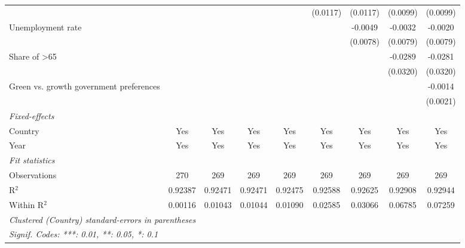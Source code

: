 \begin{table}[htbp]
\begin{tabular}{lcccccccc}
                                                                     &          &          &          &                       & (0.0117) & (0.0117) & (0.0099)              & (0.0099)\\   
      Unemployment rate                                              &          &          &          &                       &          & -0.0049  & -0.0032               & -0.0020\\   
                                                                     &          &          &          &                       &          & (0.0078) & (0.0079)              & (0.0079)\\   
      Share of >65                                                   &          &          &          &                       &          &          & -0.0289               & -0.0281\\   
                                                                     &          &          &          &                       &          &          & (0.0320)              & (0.0320)\\   
      Green vs. growth government preferences                        &          &          &          &                       &          &          &                       & -0.0014\\   
                                                                     &          &          &          &                       &          &          &                       & (0.0021)\\   
      \midrule
      \emph{Fixed-effects}\\
      Country                                                        & Yes      & Yes      & Yes      & Yes                   & Yes      & Yes      & Yes                   & Yes\\  
      Year                                                           & Yes      & Yes      & Yes      & Yes                   & Yes      & Yes      & Yes                   & Yes\\  
      \midrule
      \emph{Fit statistics}\\
      Observations                                                   & 270      & 269      & 269      & 269                   & 269      & 269      & 269                   & 269\\  
      R$^2$                                                          & 0.92387  & 0.92471  & 0.92471  & 0.92475               & 0.92588  & 0.92625  & 0.92908               & 0.92944\\  
      Within R$^2$                                                   & 0.00116  & 0.01043  & 0.01044  & 0.01090               & 0.02585  & 0.03066  & 0.06785               & 0.07259\\  
      \midrule \midrule
      \multicolumn{9}{l}{\emph{Clustered (Country) standard-errors in parentheses}}\\
      \multicolumn{9}{l}{\emph{Signif. Codes: ***: 0.01, **: 0.05, *: 0.1}}\\
   \end{tabular}
\end{table}


